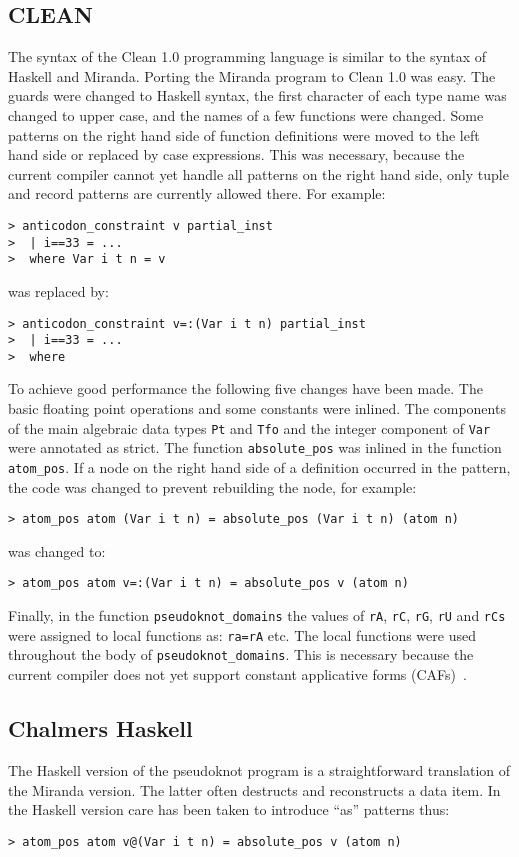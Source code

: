 \subsection{CLEAN}
The syntax of the Clean 1.0 programming language is similar to the
syntax of Haskell and Miranda. Porting the Miranda program to Clean 1.0
was easy. The guards were changed to Haskell syntax, the first
character of each type name was changed to upper case, and the names of
a few functions were changed. Some patterns on the right hand side of
function definitions were moved to the left hand side or replaced by
case expressions. This was necessary, because the current compiler
cannot yet handle all patterns on the right hand side, only tuple and
record patterns are currently allowed there. For example:
\begin{verbatim}
> anticodon_constraint v partial_inst
>  | i==33 = ...
>  where Var i t n = v
\end{verbatim}
was replaced by:
\begin{verbatim}
> anticodon_constraint v=:(Var i t n) partial_inst
>  | i==33 = ...
>  where
\end{verbatim}

To achieve good performance the following five changes have been
made. The basic floating point operations and some constants were
inlined. The components of the main algebraic data types \verb=Pt= and
\verb=Tfo= and the integer component of \verb=Var= were annotated as
strict. The function \verb=absolute_pos= was inlined in the function
\verb=atom_pos=. If a node on the right hand side of a definition
occurred in the pattern, the code was changed to prevent rebuilding the
node, for example:
\begin{verbatim}
> atom_pos atom (Var i t n) = absolute_pos (Var i t n) (atom n)
\end{verbatim}
was changed to:
\begin{verbatim}
> atom_pos atom v=:(Var i t n) = absolute_pos v (atom n)
\end{verbatim}
Finally, in the function \verb=pseudoknot_domains= the values of
\verb=rA=, \verb=rC=, \verb=rG=, \verb=rU= and \verb=rCs= were assigned
to local functions as: \verb|ra=rA| etc. The local functions were used
throughout the body of \verb=pseudoknot_domains=. This is necessary
because the current compiler does not yet support constant applicative
forms (CAFs)~\cite{Pey87}.

\subsection{Chalmers Haskell}
\label{sec:hbc}
The Haskell version of the pseudoknot program is a straightforward
translation of the Miranda version. The latter often destructs and
reconstructs a data item. In the Haskell version care has been taken to
introduce ``as'' patterns thus:
\begin{verbatim}
> atom_pos atom v@(Var i t n) = absolute_pos v (atom n)
\end{verbatim}


